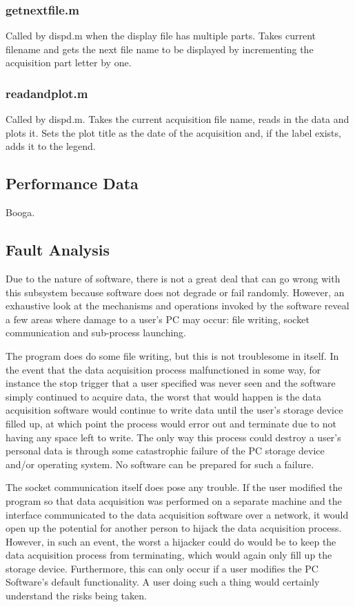 \subsubsection[getnextfile.m]{getnextfile.m}
Called by dispd.m when the display file has multiple parts. Takes current filename and gets
the next file name to be displayed by incrementing the acquisition part letter by one.


\subsubsection[readandplot.m]{readandplot.m}
Called by dispd.m. Takes the current acquisition file name, reads in the data and plots it.
Sets the plot title as the date of the acquisition and, if the label exists, adds it to the
legend.



\subsection[Performance Data]{Performance Data}
Booga.


\subsection[Fault Analysis]{Fault Analysis}
Due to the nature of software, there is not a great deal that can go wrong with this subsystem 
because software does not degrade or fail randomly. However, an exhaustive look at the mechanisms and
operations invoked by the software reveal a few areas where damage to a user's PC may occur: file 
writing, socket communication and sub-process launching.

The program does do some file writing, but this is not troublesome in itself. In the event that the data
 acquisition process malfunctioned in some way, for instance the stop trigger that a user specified was 
never seen and the software simply continued to acquire data, the worst that would happen is the data
acquisition software would continue to write data until the user's storage device filled up, at which
point the process would error out and terminate due to not having any space left to write. The only way
this process could destroy a user's personal data is through some catastrophic failure of the PC storage
device and/or operating system. No software can be prepared for such a failure.

The socket communication itself does pose any trouble. If the user modified the program so that data
acquisition was performed on a separate machine and the interface communicated to the data acquisition
software over a network, it would open up the potential for another person to hijack the data acquisition
process. However, in such an event, the worst a hijacker could do would be to keep the data acquisition
process from terminating, which would again only fill up the storage device. Furthermore, this can only
occur if a user modifies the PC Software's default functionality. A user doing such a thing would certainly
understand the risks being taken.

